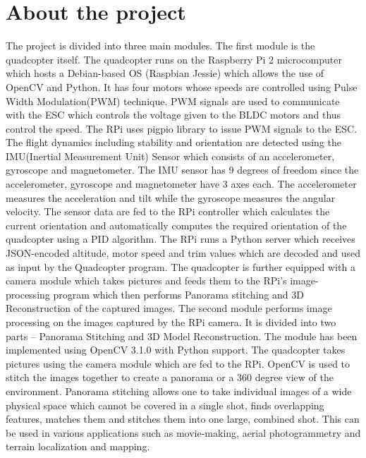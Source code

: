 \section{About the project} %
The project is divided into three main modules. The first module is the quadcopter itself.
The quadcopter runs on the Raspberry Pi 2 microcomputer which hosts a Debian-based OS (Raspbian Jessie) which allows the use of OpenCV and Python. 
It has four motors whose speeds are controlled using Pulse Width Modulation(PWM) technique. PWM signals are used to communicate with the ESC which controls the voltage given to the BLDC motors and thus control the speed. The RPi uses pigpio library to issue PWM signals to the ESC. 
\newline
\newline
The flight dynamics including stability and orientation are detected using the IMU(Inertial Measurement Unit) Sensor which consists of an accelerometer, gyroscope and magnetometer. The IMU sensor has 9 degrees of freedom since the accelerometer, gyroscope and magnetometer have 3 axes each. The accelerometer measures the acceleration and tilt while the gyroscope measures the angular velocity. The sensor data are fed to the RPi controller which calculates the current orientation and automatically computes the required orientation of the quadcopter using a PID algorithm. The RPi runs a Python server which receives JSON-encoded altitude, motor speed and trim values which are decoded and used as input by the Quadcopter program. The quadcopter is further equipped with a camera module which takes pictures and feeds them to the RPi's image-processing program which then performs Panorama stitching and 3D Reconstruction of the captured images.
\newline
\newline
The second module performs image processing on the images captured by the RPi camera. It is divided into two parts – Panorama Stitching and 3D Model Reconstruction. The module has been implemented using OpenCV 3.1.0 with Python support. The quadcopter takes pictures using the camera module which are fed to the RPi. OpenCV is used to stitch the images together to create a panorama or a 360 degree view of the environment. Panorama stitching allows one to take individual images of a wide physical space which cannot be covered in a single shot, finds overlapping features, matches them and stitches them into one large, combined shot. This can be used in various applications such as movie-making, aerial photogrammetry and terrain localization and mapping. 
